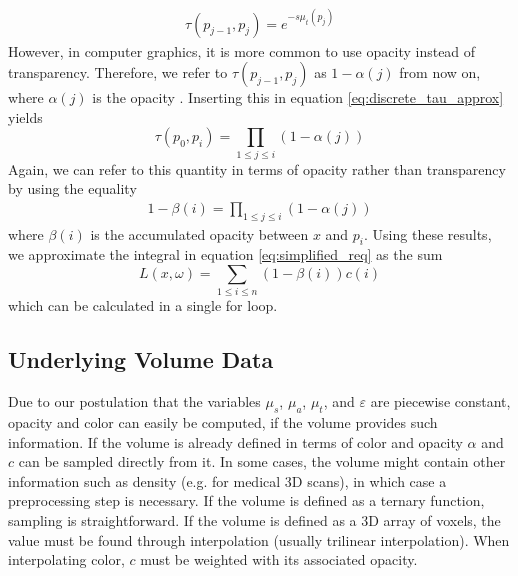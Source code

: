 \begin{align*}
\tau(p_{j-1}, p_j) = e^{-s\mu_t(p_j)}
\end{align*}
However, in computer graphics, it is more common to use opacity instead of transparency. Therefore, we refer to $\tau(p_{j-1}, p_j)$ as $1 - \alpha(j)$ from now on, where $\alpha(j)$ is the opacity \cite{10.1145/147130.147155}. Inserting this in equation \ref{eq:discrete_tau_approx} yields 
\begin{equation} \label{eq:discrete_transmittance}
\tau(p_0, p_i)=\prod_{1 \le j \le i} (1 - \alpha(j))
\end{equation}
Again, we can refer to this quantity in terms of opacity rather than transparency by using the equality
\begin{align*}
1 - \beta(i) = \prod_{1 \le j \le i} (1 - \alpha(j))
\end{align*}
where $\beta(i)$ is the accumulated opacity \cite{10.1145/147130.147155} between ${x}$ and $p_i$.
Using these results, we approximate the integral in equation \ref{eq:simplified_req} as the sum
\begin{equation} \label{eq:discrete_approximation}
L({x},\omega) = \sum_{1 \le i \le n}(1 - \beta(i))c(i)
\end{equation}
which can be calculated in a single for loop\cite{10.1145/147130.147155}.


\subsection{Underlying Volume Data}
Due to our postulation that the variables $\mu_s$, $\mu_a$, $\mu_t$, and $\varepsilon$ are piecewise constant, opacity and color can easily be computed, if the volume provides such information. If the volume is already defined in terms of color and opacity $\alpha$ and $c$ can be sampled directly from it.
In some cases, the volume might contain other information such as density (e.g. for medical 3D scans), in which case a preprocessing step\cite{511} is necessary.
If the volume is defined as a ternary function, sampling is straightforward. If the volume is defined as a 3D array of voxels, the value must be found through interpolation (usually trilinear interpolation\cite{511}).
When interpolating color, $c$ must be weighted with its associated opacity\cite{729595}.

